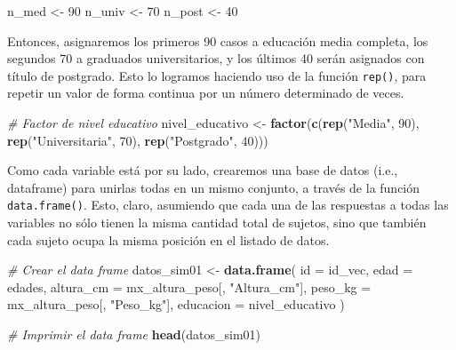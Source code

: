\documentclass[
]{book}
\newenvironment{Shaded}{\begin{snugshade}}{\end{snugshade}}
\newcommand{\AttributeTok}[1]{\textcolor[rgb]{0.13,0.29,0.53}{#1}}
\newcommand{\CommentTok}[1]{\textcolor[rgb]{0.56,0.35,0.01}{\textit{#1}}}
\newcommand{\DecValTok}[1]{\textcolor[rgb]{0.00,0.00,0.81}{#1}}
\newcommand{\FunctionTok}[1]{\textcolor[rgb]{0.13,0.29,0.53}{\textbf{#1}}}
\newcommand{\NormalTok}[1]{#1}
\newcommand{\OtherTok}[1]{\textcolor[rgb]{0.56,0.35,0.01}{#1}}
\newcommand{\StringTok}[1]{\textcolor[rgb]{0.31,0.60,0.02}{#1}}
\begin{document}
\begin{Shaded}
\begin{Highlighting}[]
\NormalTok{n\_med  }\OtherTok{\textless{}{-}} \DecValTok{90}
\NormalTok{n\_univ }\OtherTok{\textless{}{-}} \DecValTok{70}
\NormalTok{n\_post }\OtherTok{\textless{}{-}} \DecValTok{40}
\end{Highlighting}
\end{Shaded}

Entonces, asignaremos los primeros 90 casos a educación media completa, los segundos 70 a graduados universitarios, y los últimos 40 serán asignados con título de postgrado. Esto lo logramos haciendo uso de la función \texttt{rep()}, para repetir un valor de forma continua por un número determinado de veces.

\begin{Shaded}
\begin{Highlighting}[]
\CommentTok{\# Factor de nivel educativo}
\NormalTok{nivel\_educativo }\OtherTok{\textless{}{-}} \FunctionTok{factor}\NormalTok{(}\FunctionTok{c}\NormalTok{(}\FunctionTok{rep}\NormalTok{(}\StringTok{"Media"}\NormalTok{, }\DecValTok{90}\NormalTok{), }\FunctionTok{rep}\NormalTok{(}\StringTok{"Universitaria"}\NormalTok{, }\DecValTok{70}\NormalTok{), }\FunctionTok{rep}\NormalTok{(}\StringTok{"Postgrado"}\NormalTok{, }\DecValTok{40}\NormalTok{)))}
\end{Highlighting}
\end{Shaded}

Como cada variable está por su lado, crearemos una base de datos (i.e., dataframe) para unirlas todas en un mismo conjunto, a través de la función \texttt{data.frame()}. Esto, claro, asumiendo que cada una de las respuestas a todas las variables no sólo tienen la misma cantidad total de sujetos, sino que también cada sujeto ocupa la misma posición en el listado de datos.

\begin{Shaded}
\begin{Highlighting}[]
\CommentTok{\# Crear el data frame}
\NormalTok{datos\_sim01 }\OtherTok{\textless{}{-}} \FunctionTok{data.frame}\NormalTok{(}
               \AttributeTok{id =}\NormalTok{ id\_vec,}
               \AttributeTok{edad =}\NormalTok{ edades,}
               \AttributeTok{altura\_cm =}\NormalTok{ mx\_altura\_peso[, }\StringTok{"Altura\_cm"}\NormalTok{],}
               \AttributeTok{peso\_kg =}\NormalTok{ mx\_altura\_peso[, }\StringTok{"Peso\_kg"}\NormalTok{],}
               \AttributeTok{educacion =}\NormalTok{ nivel\_educativo}
\NormalTok{)}

\CommentTok{\# Imprimir el data frame}
\FunctionTok{head}\NormalTok{(datos\_sim01)}
\end{Highlighting}
\end{Shaded}
\end{document}
